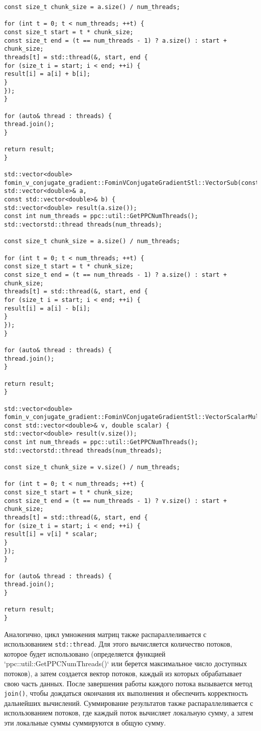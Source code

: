 \documentclass[12pt]{article}
\begin{document}
\begin{verbatim}
const size_t chunk_size = a.size() / num_threads;

for (int t = 0; t < num_threads; ++t) {
const size_t start = t * chunk_size;
const size_t end = (t == num_threads - 1) ? a.size() : start + chunk_size;
threads[t] = std::thread(&, start, end {
for (size_t i = start; i < end; ++i) {
result[i] = a[i] + b[i];
}
});
}

for (auto& thread : threads) {
thread.join();
}

return result;
}

std::vector<double> fomin_v_conjugate_gradient::FominVConjugateGradientStl::VectorSub(const std::vector<double>& a,
const std::vector<double>& b) {
std::vector<double> result(a.size());
const int num_threads = ppc::util::GetPPCNumThreads();
std::vectorstd::thread threads(num_threads);

const size_t chunk_size = a.size() / num_threads;

for (int t = 0; t < num_threads; ++t) {
const size_t start = t * chunk_size;
const size_t end = (t == num_threads - 1) ? a.size() : start + chunk_size;
threads[t] = std::thread(&, start, end {
for (size_t i = start; i < end; ++i) {
result[i] = a[i] - b[i];
}
});
}

for (auto& thread : threads) {
thread.join();
}

return result;
}

std::vector<double> fomin_v_conjugate_gradient::FominVConjugateGradientStl::VectorScalarMultiply(
const std::vector<double>& v, double scalar) {
std::vector<double> result(v.size());
const int num_threads = ppc::util::GetPPCNumThreads();
std::vectorstd::thread threads(num_threads);

const size_t chunk_size = v.size() / num_threads;

for (int t = 0; t < num_threads; ++t) {
const size_t start = t * chunk_size;
const size_t end = (t == num_threads - 1) ? v.size() : start + chunk_size;
threads[t] = std::thread(&, start, end {
for (size_t i = start; i < end; ++i) {
result[i] = v[i] * scalar;
}
});
}

for (auto& thread : threads) {
thread.join();
}

return result;
}
\end{verbatim}

Аналогично, цикл умножения матриц также распараллеливается с использованием \texttt{std::thread}. 
Для этого вычисляется количество потоков, которое будет использовано (определяется функцией `ppc::util::GetPPCNumThreads()` или берется максимальное число доступных потоков),
а затем создается вектор потоков, каждый из которых обрабатывает свою часть данных. После завершения работы каждого потока вызывается метод \texttt{join()}, чтобы дождаться окончания их выполнения и обеспечить корректность дальнейших вычислений.  
Суммирование результатов также распараллеливается с использованием потоков, где каждый поток вычисляет локальную сумму, а затем эти локальные суммы суммируются в общую сумму.
\end{document}
